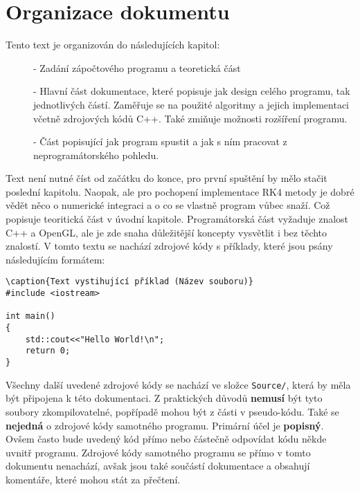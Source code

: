
\chapter*{Organizace dokumentu}
Tento text je organizován do následujících kapitol:
\begin{description}
	\item[] - Zadání zápočtového programu a teoretická část
	\item[] - Hlavní část dokumentace, které popisuje jak design celého programu, tak jednotlivých částí. Zaměřuje se na použité algoritmy a jejich implementaci včetně zdrojových kódů C++.
	Také zmiňuje možnosti rozšíření programu.
	\item[] - Část popisující jak program spustit a jak s ním pracovat z neprogramátorského pohledu.
	
\end{description}
Text není nutné číst od začátku do konce, pro první spuštění by mělo stačit poslední kapitolu. Naopak, ale pro pochopení implementace RK4 metody je dobré vědět něco o numerické integraci a o co se vlastně program vůbec snaží. Což popisuje teoritická část v úvodní kapitole. Programátorská část vyžaduje znalost C++ a OpenGL, ale je zde snaha důležitější koncepty vysvětlit  i bez těchto znalostí. V tomto textu se nachází  zdrojové kódy s příklady, které jsou psány následujícím formátem:
\begin{lstlisting}
\caption{Text vystihující příklad (Název souboru)}
#include <iostream>

int main()
{
	std::cout<<"Hello World!\n";
	return 0;
}
\end{lstlisting}
Všechny další uvedené zdrojové kódy se nachází ve složce \texttt{Source/}, která
by měla být připojena k této dokumentaci. Z praktických důvodů \textbf{nemusí} být tyto soubory zkompilovatelné, popřípadě mohou být z části v pseudo-kódu. Také se \textbf{nejedná} o zdrojové kódy samotného programu. Primární účel je \textbf{popisný}. Ovšem často bude uvedený kód přímo nebo částečně odpovídat kódu někde uvnitř programu.
Zdrojové kódy samotného programu se přímo v tomto dokumentu nenachází, avšak jsou také součástí dokumentace a obsahují komentáře, které mohou stát za přečtení.

